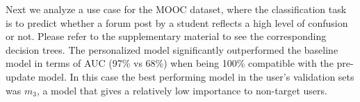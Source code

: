 \documentclass[letterpaper]{article} %
\theoremstyle{definition}
\begin{document}
     
    
      
%


Next we analyze a use case for the MOOC dataset, where the classification task is to predict whether a forum post by a student reflects a high level of confusion or not. Please refer to the supplementary material to see the corresponding decision trees. The personalized model significantly outperformed the baseline model in terms of AUC (97\% vs 68\%) when being 100\% compatible with the pre-update model. In this case the best performing model in the user's validation sets was $m_3$, a model that gives a relatively low importance to non-target users. 
\end{document}
